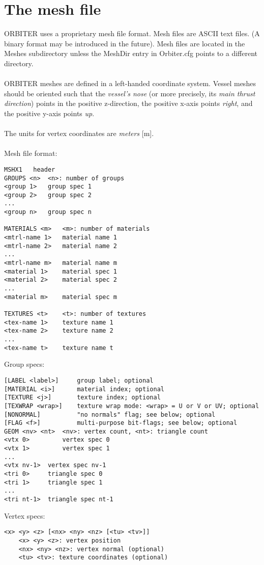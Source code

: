 \documentclass[Orbiter Developer Manual.tex]{subfiles}
\begin{document}
\section{The mesh file}
ORBITER uses a proprietary mesh file format. Mesh files are ASCII text files. (A binary format may be introduced in the future). Mesh files are located in the Meshes subdirectory unless the MeshDir entry in Orbiter.cfg points to a different directory.\\
\\
ORBITER meshes are defined in a left-handed coordinate system. Vessel meshes should be oriented such that the \textit{vessel’s nose} (or more precisely, its \textit{main thrust direction}) points in the positive z-direction, the positive x-axis points \textit{right}, and the positive y-axis points \textit{up}.\\
\\
The units for vertex coordinates are \textit{meters} [m].\\
\\
Mesh file format:
\begin{lstlisting}
MSHX1	header
GROUPS <n>	<n>: number of groups
<group 1>	group spec 1
<group 2>	group spec 2
...
<group n>	group spec n

MATERIALS <m>	<m>: number of materials
<mtrl-name 1>	material name 1
<mtrl-name 2>	material name 2
...
<mtrl-name m>	material name m
<material 1>	material spec 1
<material 2>	material spec 2
...
<material m>	material spec m

TEXTURES <t>	<t>: number of textures
<tex-name 1>	texture name 1
<tex-name 2>	texture name 2
...
<tex-name t>	texture name t
\end{lstlisting}

\noindent
Group specs:

\begin{lstlisting}
[LABEL <label>]		group label; optional
[MATERIAL <i>]		material index; optional
[TEXTURE <j>]		texture index; optional
[TEXWRAP <wrap>]	texture wrap mode: <wrap> = U or V or UV; optional
[NONORMAL]			"no normals" flag; see below; optional
[FLAG <f>]			multi-purpose bit-flags; see below; optional
GEOM <nv> <nt>	<nv>: vertex count, <nt>: triangle count
<vtx 0>			vertex spec 0
<vtx 1>			vertex spec 1
...
<vtx nv-1>	vertex spec nv-1
<tri 0>		triangle spec 0
<tri 1>		triangle spec 1
...
<tri nt-1>	triangle spec nt-1
\end{lstlisting}

\noindent
Vertex specs:

\begin{lstlisting}
<x> <y> <z> [<nx> <ny> <nz> [<tu> <tv>]]
	<x> <y> <z>: vertex position
	<nx> <ny> <nz>: vertex normal (optional)
	<tu> <tv>: texture coordinates (optional)
\end{lstlisting}
\end{document}

